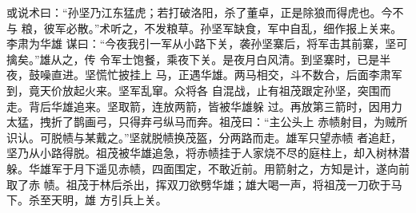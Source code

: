 或说术曰：“孙坚乃江东猛虎；若打破洛阳，杀了董卓，正是除狼而得虎也。今不与
粮，彼军必散。”术听之，不发粮草。孙坚军缺食，军中自乱，细作报上关来。李肃为华雄
谋曰：“今夜我引一军从小路下关，袭孙坚寨后，将军击其前寨，坚可擒矣。”雄从之，传
令军士饱餐，乘夜下关。是夜月白风清。到坚寨时，已是半夜，鼓噪直进。坚慌忙披挂上
马，正遇华雄。两马相交，斗不数合，后面李肃军到，竟天价放起火来。坚军乱窜。众将各
自混战，止有祖茂跟定孙坚，突围而走。背后华雄追来。坚取箭，连放两箭，皆被华雄躲
过。再放第三箭时，因用力太猛，拽折了鹊画弓，只得弃弓纵马而奔。祖茂曰：“主公头上
赤帻射目，为贼所识认。可脱帻与某戴之。”坚就脱帻换茂盔，分两路而走。雄军只望赤帻
者追赶，坚乃从小路得脱。祖茂被华雄追急，将赤帻挂于人家烧不尽的庭柱上，却入树林潜
躲。华雄军于月下遥见赤帻，四面围定，不敢近前。用箭射之，方知是计，遂向前取了赤
帻。祖茂于林后杀出，挥双刀欲劈华雄；雄大喝一声，将祖茂一刀砍于马下。杀至天明，雄
方引兵上关。

